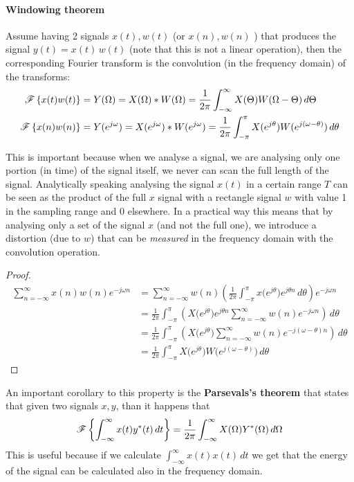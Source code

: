 		\paragraph{Windowing theorem} Assume having 2 signals $x(t),w(t)$ (or $x(n), w(n)$ ) that produces the signal $y(t) = x(t) \, w(t)$ (note that this is not a linear operation), then the corresponding Fourier transform is the convolution (in the frequency domain) of the transforms:
		\begin{equation}
		\begin{split}
			\mathscr{F}\left\{ x(t)w(t) \right\} & = Y(\Omega) = X(\Omega)*W(\Omega) = \frac 1 {2\pi} \int_{-\infty}^{\infty} X(\Theta) W(\Omega - \Theta)\, d\Theta \\
			\mathscr{F}\left\{ x(n)w(n) \right\} & =  Y(e^{j\omega}) = X(e^{j\omega}) * W(e^{j\omega}) = \frac 1 {2\pi} \int_{-\pi}^\pi X(e^{j\theta}) W(e^{j(\omega-\theta)}) \, d\theta
		\end{split}
		\end{equation}
		
		This is important because when we analyse a signal, we are analysing only one portion (in time) of the signal itself, we never can scan the full length of the signal. Analytically speaking analysing the signal $x(t)$ in a certain range $T$ can be seen as the product of the full $x$ signal with a rectangle signal $w$ with value 1 in the sampling range and 0 elsewhere. In a practical way this means that by analysing only a set of the signal $x$ (and not the full one), we introduce a distortion (due to $w$) that can be \textit{measured} in the frequency domain with the convolution operation.
		
		\begin{proof}
		\begin{align*}
			\sum_{n=-\infty}^\infty x(n) w(n) e^{-j\omega n} & = \sum_{n=-\infty}^\infty w(n) \left( \frac 1 {2\pi} \int_{-\pi}^\pi x\big(e^{j\theta}\big) e^{j\theta n} \, d\theta \right) e^{-j\omega n} \\
			& = \frac 1 {2\pi} \int_{-\pi}^\pi \left( X\big(e^{j\theta}\big) e^{j\theta n} \sum_{n=-\infty}^\infty w(n) e^{-j\omega n} \right) \, d\theta \\
			& = \frac 1 {2\pi} \int_{-\pi}^\pi \left( X\big(e^{j\theta}\big)  \sum_{n=-\infty}^\infty w(n) e^{-j(\omega-\theta) n} \right) \, d\theta \\
			& = \frac 1 {2\pi} \int_{-\pi}^\pi X\big(e^{j\theta}\big) W \big(e^{j(\omega - \theta)}\big) \, d\theta
		\end{align*}
		\end{proof}
		An important corollary to this property is the \textbf{Parsevals's theorem} that states that given two signals $x,y$, than it happens that
		\begin{equation}
			\mathscr{F}\left\{ \int_{-\infty}^\infty x(t) y^* (t)\, dt \right\} = \frac 1 {2\pi} \int_{-\infty} ^\infty X(\Omega) Y^*(\Omega)\, d\Omega
		\end{equation}
		This is useful because if we calculate $\int_{-\infty}^\infty x(t)x(t)\, dt$ we get that the energy of the signal can be calculated also in the frequency domain.
		
